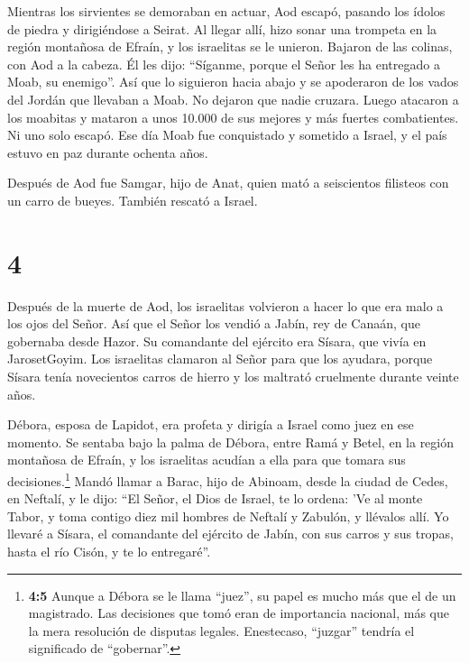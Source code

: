  Mientras los sirvientes se demoraban en actuar, Aod
escapó, pasando los ídolos de piedra y dirigiéndose a Seirat.
 Al llegar allí, hizo sonar una trompeta en la región
montañosa de Efraín, y los israelitas se le unieron. Bajaron de las
colinas, con Aod a la cabeza.  Él les dijo: ``Síganme,
porque el Señor les ha entregado a Moab, su enemigo''. Así que lo
siguieron hacia abajo y se apoderaron de los vados del Jordán que
llevaban a Moab. No dejaron que nadie cruzara.  Luego
atacaron a los moabitas y mataron a unos 10.000 de sus mejores y más
fuertes combatientes. Ni uno solo escapó.  Ese día Moab fue
conquistado y sometido a Israel, y el país estuvo en paz durante ochenta
años.

 Después de Aod fue Samgar, hijo de Anat, quien mató a
seiscientos filisteos con un carro de bueyes. También rescató a Israel.

\hypertarget{section-3}{%
\section{4}\label{section-3}}

 Después de la muerte de Aod, los israelitas volvieron a
hacer lo que era malo a los ojos del Señor.  Así que el
Señor los vendió a Jabín, rey de Canaán, que gobernaba desde Hazor. Su
comandante del ejército era Sísara, que vivía en JarosetGoyim.
 Los israelitas clamaron al Señor para que los ayudara,
porque Sísara tenía novecientos carros de hierro y los maltrató
cruelmente durante veinte años.

 Débora, esposa de Lapidot, era profeta y dirigía a Israel
como juez en ese momento.  Se sentaba bajo la palma de
Débora, entre Ramá y Betel, en la región montañosa de Efraín, y los
israelitas acudían a ella para que tomara sus decisiones.\footnote{\textbf{4:5}
  Aunque a Débora se le llama ``juez'', su papel es mucho más que el de
  un magistrado. Las decisiones que tomó eran de importancia nacional,
  más que la mera resolución de disputas legales. Enestecaso, ``juzgar''
  tendría el significado de ``gobernar''.}  Mandó llamar a
Barac, hijo de Abinoam, desde la ciudad de Cedes, en Neftalí, y le dijo:
``El Señor, el Dios de Israel, te lo ordena: 'Ve al monte Tabor, y toma
contigo diez mil hombres de Neftalí y Zabulón, y llévalos allí.
 Yo llevaré a Sísara, el comandante del ejército de Jabín,
con sus carros y sus tropas, hasta el río Cisón, y te lo entregaré''.

